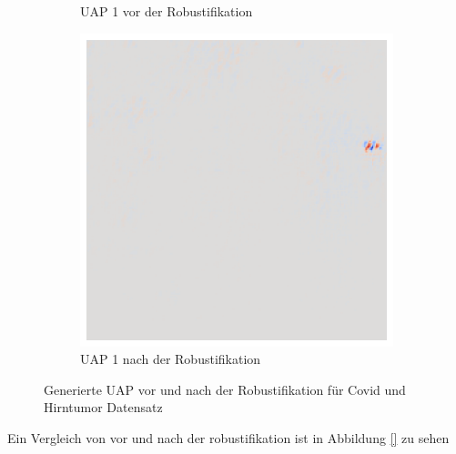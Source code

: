 \begin{figure}[ht!]
\begin{subfigure}{0.19\linewidth}
        \caption{UAP 1 vor der Robustifikation}
    \end{subfigure}
    \begin{subfigure}{0.19\linewidth}
        \centering
        \includegraphics[height=1\linewidth]{01-images/05-resultate/uap_resnet/uap0-resnet18-covid-n200-robustificationslevel7.png}
        \caption{UAP 1 nach der Robustifikation}
    \end{subfigure}
    \caption{Generierte UAP vor und nach der Robustifikation für Covid und Hirntumor Datensatz}
    \label{fig:uap-resnet18-mri-rob0}
\end{figure}

Ein Vergleich von vor und nach der robustifikation ist in Abbildung \ref{} zu sehen

